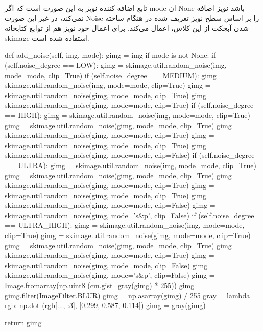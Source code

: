 \documentclass[12pt,titlepage,a4page , tikz , multi,table , svgnames,xcdraw]{article}
\begin{document}
تابع اضافه کننده نویز به این صورت است که اگر mode ان None باشد نویز اضافه نمی‌کند، در غیر این صورت Noise را بر اساس سطح نویز تعریف شده در هنگام ساخته شدن آبجکت از این کلاس، اعمال می‌کند. برای اعمال خود نویز هم از توابع کتابخانه skimage استفاده شده است.



\begin{latin}
\begin{python}[language=Python]
 def add_noise(self, img, mode):
        gimg = img
        if mode is not None:
            if (self.noise_degree == LOW):
                gimg = skimage.util.random_noise(img,
                 mode=mode, clip=True)
            if (self.noise_degree == MEDIUM):
                gimg = skimage.util.random_noise(img,
                 mode=mode, clip=True)
                gimg = skimage.util.random_noise(gimg,
                 mode=mode, clip=True)
                gimg = skimage.util.random_noise(gimg,
                 mode=mode, clip=True)
            if (self.noise_degree == HIGH):
                gimg = skimage.util.random_noise(img, 
                mode=mode, clip=True)
                gimg = skimage.util.random_noise(gimg,
                 mode=mode, clip=True)
                gimg = skimage.util.random_noise(gimg, 
                mode=mode, clip=True)
                gimg = skimage.util.random_noise(gimg, 
                mode=mode, clip=True)
                gimg = skimage.util.random_noise(gimg,
                 mode=mode, clip=False)
            if (self.noise_degree == ULTRA):
                gimg = skimage.util.random_noise(img, 
                mode=mode, clip=True)
                gimg = skimage.util.random_noise(gimg, 
                mode=mode, clip=True)
                gimg = skimage.util.random_noise(gimg,
                 mode=mode, clip=True)
                gimg = skimage.util.random_noise(gimg,
                 mode=mode, clip=True)
                gimg = skimage.util.random_noise(gimg,
                 mode=mode, clip=False)
                gimg = skimage.util.random_noise(gimg,
                 mode='s&p', clip=False)
            if (self.noise_degree == ULTRA_HIGH):
                gimg = skimage.util.random_noise(img, 
                mode=mode, clip=True)
                gimg = skimage.util.random_noise(gimg,
                 mode=mode, clip=True)
                gimg = skimage.util.random_noise(gimg, 
                mode=mode, clip=True)
                gimg = skimage.util.random_noise(gimg,
                 mode=mode, clip=True)
                gimg = skimage.util.random_noise(gimg,
                 mode=mode, clip=False)
                gimg = skimage.util.random_noise(gimg, 
                mode='s&p', clip=False)
                gimg = Image.fromarray(np.uint8
                (cm.gist_gray(gimg) * 255))
                gimg = gimg.filter(ImageFilter.BLUR)
                gimg = np.asarray(gimg) / 255
                gray = lambda rgb: np.dot
                (rgb[..., :3], [0.299, 0.587, 0.114])
                gimg = gray(gimg)

        return gimg
\end{python}

\end{latin}
\end{document}
